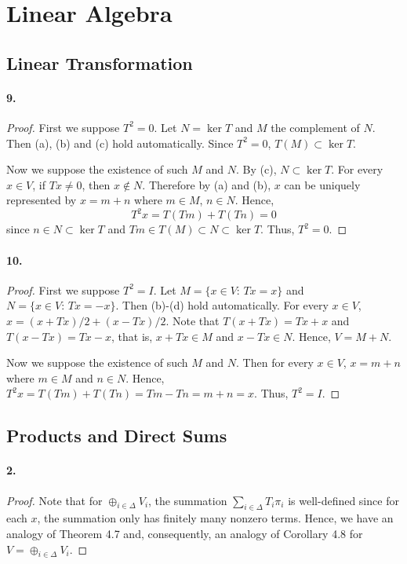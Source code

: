 \section{Linear Algebra}
\setcounter{subsection}{2}
\subsection{Linear Transformation}
  \paragraph{9.}
  \begin{proof}
    First we suppose $T^2=0$. Let $N=\ker T$ and $M$ the complement of $N$. Then 
    (a), (b) and (c) hold automatically. Since $T^2=0$, $T(M)\subset\ker T$.
    \par
    Now we suppose the existence of such $M$ and $N$. By (c), $N\subset\ker T$.
    For every $x\in V$, if $Tx\ne 0$, then $x\notin N$. Therefore by (a) and
    (b), $x$ can be uniquely represented by $x=m+n$ where $m\in M$, $n\in N$. 
    Hence,
    \[
      T^2x = T(Tm) + T(Tn) = 0
    \]
    since $n\in N\subset\ker T$ and $Tm\in T(M)\subset N\subset\ker T$. Thus, 
    $T^2=0$.
  \end{proof}
  
  \paragraph{10.}
  \begin{proof}
    First we suppose $T^2=I$. Let $M=\{x\in V:\, Tx=x\}$ and $N=\{x\in V:\, Tx=
    -x\}$. Then (b)-(d) hold automatically. For every $x\in V$, $x=(x+Tx)/2+(x-
    Tx)/2$. Note that $T(x+Tx)=Tx+x$ and $T(x-Tx)=Tx-x$, that is, $x+Tx\in M$ 
    and $x-Tx\in N$. Hence, $V=M+N$.\par
    Now we suppose the existence of such $M$ and $N$. Then for every $x\in V$,
    $x=m+n$ where $m\in M$ and $n\in N$. Hence, $T^2x= T(Tm)+T(Tn) = Tm-Tn=m+n
    =x$. Thus, $T^2=I$.
  \end{proof}
\subsection{Products and Direct Sums}
  \paragraph{2.}
  \begin{proof}
    Note that for $\oplus_{i\in\Delta}V_i$, the summation $\sum_{i\in\Delta}T_i
    \pi_i$ is well-defined since for each $x$, the summation only has finitely
    many nonzero terms. Hence, we have an analogy of Theorem 4.7 and, 
    consequently, an analogy of Corollary 4.8 for $V=\oplus_{i\in\Delta}V_i$.
  \end{proof}
  
